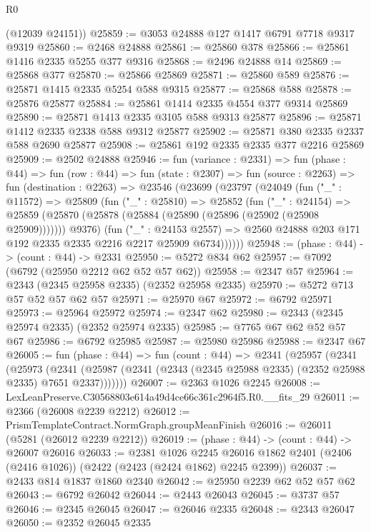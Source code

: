 \begin{lexlean}{R0}
\begin{coremodule}
      (@12039 @24151))
@25859 := @3053 @24888 @127 @1417 @6791 @7718 @9317 @9319
@25860 := @2468 @24888
@25861 := @25860 @378
@25866 := @25861 @1416 @2335 @5255 @377 @9316
@25868 := @2496 @24888 @14
@25869 := @25868 @377
@25870 := @25866 @25869
@25871 := @25860 @589
@25876 := @25871 @1415 @2335 @5254 @588 @9315
@25877 := @25868 @588
@25878 := @25876 @25877
@25884 := @25861 @1414 @2335 @4554 @377 @9314 @25869
@25890 := @25871 @1413 @2335 @3105 @588 @9313 @25877
@25896 := @25871 @1412 @2335 @2338 @588 @9312 @25877
@25902 := @25871 @380 @2335 @2337 @588 @2690 @25877
@25908 := @25861 @192 @2335 @2335 @377 @2216 @25869
@25909 := @2502 @24888
@25946 := fun (variance : @2331) =>
  fun (phase : @44) =>
  fun (row : @44) =>
  fun (state : @2307) =>
  fun (source : @2263) =>
  fun (destination : @2263) =>
  @23546
    (@23699
      (@23797
        (@24049
          (fun ("_" : @11572) =>
          @25809
            (fun ("_" : @25810) =>
            @25852
              (fun ("_" : @24154) =>
              @25859 (@25870 (@25878 (@25884 (@25890 (@25896 (@25902 (@25908 @25909))))))) @9376)
              (fun ("_" : @24153 @2557) =>
              @2560 @24888 @203 @171 @192 @2335 @2335 @2216 @2217 @25909 @6734))))))
@25948 := (phase : @44) -> (count : @44) -> @2331
@25950 := @5272 @834 @62
@25957 := @7092 (@6792 (@25950 @2212 @62 @52 @57 @62))
@25958 := @2347 @57
@25964 := @2343 (@2345 @25958 @2335) (@2352 @25958 @2335)
@25970 := @5272 @713 @57 @52 @57 @62 @57
@25971 := @25970 @67
@25972 := @6792 @25971
@25973 := @25964 @25972
@25974 := @2347 @62
@25980 := @2343 (@2345 @25974 @2335) (@2352 @25974 @2335)
@25985 := @7765 @67 @62 @52 @57 @67
@25986 := @6792 @25985
@25987 := @25980 @25986
@25988 := @2347 @67
@26005 := fun (phase : @44) =>
  fun (count : @44) =>
  @2341
    (@25957
      (@2341
        (@25973
          (@2341 (@25987 (@2341 (@2343 (@2345 @25988 @2335) (@2352 @25988 @2335) @7651 @2337)))))))
@26007 := @2363 @1026 @2245
@26008 := LexLeanPreserve.C30568803e614a49d4ce66c361c2964f5.R0.__fits_29
@26011 := @2366 (@26008 @2239 @2212)
@26012 := PrismTemplateContract.NormGraph.groupMeanFinish
@26016 := @26011 (@5281 (@26012 @2239 @2212))
@26019 := (phase : @44) -> (count : @44) -> @26007 @26016
@26033 := @2381
    @1026
    @2245
    @26016
    @1862
    @2401
    (@2406 (@2416 @1026))
    (@2422 (@2423 (@2424 @1862) @2245 @2399))
@26037 := @2433 @814 @1837 @1860 @2340
@26042 := @25950 @2239 @62 @52 @57 @62
@26043 := @6792 @26042
@26044 := @2443 @26043
@26045 := @3737 @57
@26046 := @2345 @26045
@26047 := @26046 @2335
@26048 := @2343 @26047
@26050 := @2352 @26045 @2335

\end{coremodule}
\end{lexlean}
